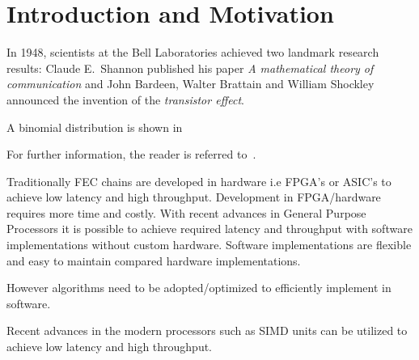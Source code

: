 \chapter{Introduction and Motivation} \label{chap:introduction}

In 1948, scientists at the Bell Laboratories achieved two landmark research results:
Claude E.~Shannon published his paper \emph{A mathematical theory of communication} and John Bardeen, Walter Brattain and William Shockley announced the invention of the \emph{transistor effect}.

\cite{Arikan}

A binomial distribution is shown in %


For further information, the reader is referred to~\cite{Cover}.\newline

Traditionally FEC chains are developed in hardware i.e FPGA’s or ASIC’s to achieve low latency and high throughput.
Development in FPGA/hardware requires more time and costly.
With recent advances in General Purpose Processors it is possible to achieve required latency and throughput with software implementations without custom hardware.
Software implementations are flexible and easy to maintain compared hardware implementations.

However algorithms need to be adopted/optimized to efficiently implement in software.

Recent advances in the modern processors such as SIMD units can be utilized to achieve low latency and high throughput.

\cite{PolarCodesPrimaryConcepts}

\cite{DesignOfPolarCodes5G}

\cite{fastSSC}

\cite{multiGbpsSoftwareDec}

\cite{SCL}

\cite{fastPolarDecodersAlgoImpl}

\clearpage
